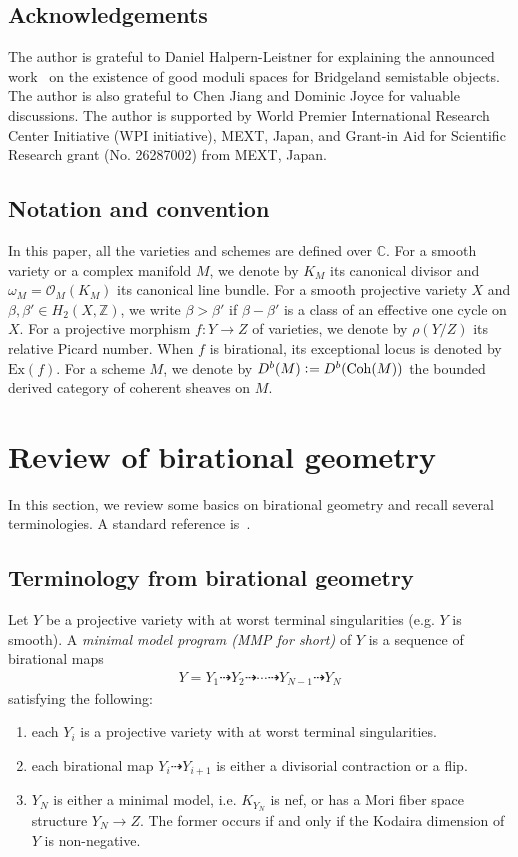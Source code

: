 \documentclass[11pt]{amsart}
\theoremstyle{plain}
\theoremstyle{definition}
\theoremstyle{remark}
\newcommand{\oO}{\mathcal{O}}
\newcommand{\Coh}{\mathop{\rm Coh}\nolimits}
\begin{document}
\subsection{Acknowledgements}
The author is grateful to Daniel 
Halpern-Leistner
for explaining the announced work~\cite{AHLH}
on the existence of good moduli spaces for 
Bridgeland semistable objects. 
The author is also grateful to
Chen Jiang and Dominic Joyce 
for valuable discussions. 
The author is supported by World Premier International Research Center
Initiative (WPI initiative), MEXT, Japan, and Grant-in Aid for Scientific
Research grant (No. 26287002) from MEXT, Japan.

\subsection{Notation and convention}
In this paper, all the varieties and schemes are 
defined over $\mathbb{C}$. 
For a smooth variety or a complex manifold $M$, 
we denote by $K_M$ its canonical divisor 
and $\omega_M=\oO_M(K_M)$ its canonical line bundle. 
For 
a smooth projective variety $X$ and 
$\beta, \beta' \in H_2(X, \mathbb{Z})$, we 
write $\beta> \beta'$ if 
$\beta-\beta'$ is a class of an effective one cycle 
on $X$. 
For a projective morphism $f \colon Y \to Z$ of varieties, we denote by 
$\rho(Y/Z)$ its relative Picard number. 
When $f$ is birational, its exceptional locus is 
denoted by $\mathrm{Ex}(f)$. 
For a scheme $M$, we denote by 
$D^b(M) \cneq D^b(\Coh(M))$ the bounded derived category 
of coherent sheaves on $M$. 

\section{Review of birational geometry}\label{sec:birational}
In this section, we review some basics on 
birational geometry and recall several terminologies. 
A standard reference is~\cite{KM}. 
\subsection{Terminology from birational geometry}
Let $Y$ be a projective variety with at worst terminal singularities
(e.g. $Y$ is smooth).
A \textit{minimal model program (MMP for short)}
 of $Y$ is a sequence of birational maps
\begin{align}\label{MMP}
Y=Y_1 \dashrightarrow Y_2 \dashrightarrow \cdots \dashrightarrow
Y_{N-1} \dashrightarrow
Y_N
\end{align}
satisfying the following: 
\begin{enumerate}
\item each $Y_i$ is a projective variety with 
at worst terminal singularities. 
\item each birational map 
$Y_i \dashrightarrow Y_{i+1}$ is either a divisorial 
contraction or a flip. 
\item $Y_N$ is either a minimal model, i.e. 
$K_{Y_N}$ is nef, 
or has a Mori fiber space structure $Y_N \to Z$. 
The former occurs if and only if the Kodaira dimension of $Y$ is non-negative. 
\end{enumerate}
\end{document}
